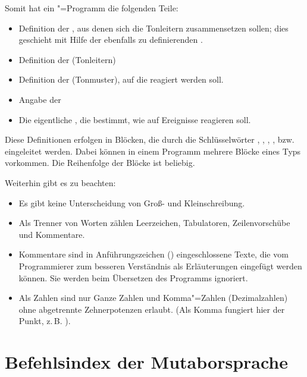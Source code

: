 {Somit hat ein \mutabor{}"=Programm die folgenden Teile:

\begin{itemize}
\item Definition der , aus denen sich die
  Tonleitern zusammensetzen sollen; dies geschieht mit Hilfe der
  ebenfalls zu definierenden .
\item Definition der 
  (Tonleitern)
\item Definition der  (Tonmuster),
  auf die reagiert werden soll.
\item Angabe der 
\item Die eigentliche , die
  bestimmt, wie \mutabor{} auf Ereignisse reagieren soll.
\end{itemize}


Diese Definitionen erfolgen in Blöcken, die durch die Schlüsselwörter
, , ,
,  bzw.  
eingeleitet werden. Dabei können in einem Programm mehrere Blöcke
eines Typs vorkommen. Die Reihenfolge der Blöcke ist beliebig.

Weiterhin gibt es zu beachten:

\begin{itemize}
\item Es gibt keine Unterscheidung von Groß- und Kleinschreibung.
\item Als Trenner von Worten zählen Leerzeichen, Tabulatoren,
  Zeilenvorschübe und Kommentare.
\item Kommentare sind in Anführungszeichen (\dq)
  eingeschlossene Texte, die vom Programmierer zum besseren
  Verständnis als Erläuterungen eingefügt werden können. Sie werden
  beim Übersetzen des Programms ignoriert.
\item Als Zahlen sind nur Ganze Zahlen und Komma"=Zahlen
  (Dezimalzahlen) ohne abgetrennte Zehnerpotenzen erlaubt. (Als Komma
  fungiert hier der Punkt, z.\,B. ).
\end{itemize}



\chapter{Befehlsindex der Mutaborsprache}\label{sec:SX_COMMANDS}

}
